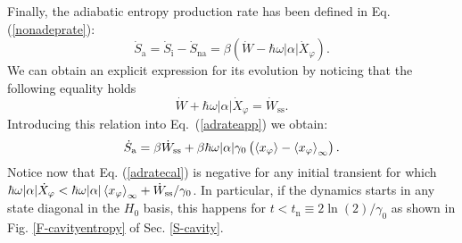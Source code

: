 \documentclass[aps,prx,twocolumn,showpacs,floatfix,superscriptaddress,graphics,longbibliography]{revtex4-1}
\begin{document}
Finally, the adiabatic entropy production rate has been defined in Eq. (\ref{nonadeprate}):
\begin{equation}\label{adrateapp}
\dot{S}_\mathrm{a} = \dot{S}_\mathrm{i} - \dot{S}_\mathrm{na} = \beta(\dot{W} - \hbar \omega |\alpha| \dot{X}_{\varphi}).
\end{equation}
We can obtain an explicit expression for its evolution by noticing that the following equality holds
\begin{equation} 
\dot{W} + \hbar \omega |\alpha| \dot{X}_{\varphi} = \dot{W}_\mathrm{ss}.
\end{equation}
Introducing this relation into Eq.~(\ref{adrateapp}) we obtain:
\begin{equation} \label{adratecal}
 \dot{S}_{\mathrm a} = \beta \dot{W}_{\mathrm{ss}} + \beta \hbar \omega |\alpha| \gamma_0 \left(\langle x_{\varphi} \rangle - \braket{x_{\varphi}}_\infty \right).
\end{equation}
Notice now that Eq. (\ref{adratecal}) is negative for any initial transient for which $\hbar \omega |\alpha| \dot X_{\varphi} < \hbar \omega |\alpha| \braket{x_{\varphi}}_\infty 
+ \dot{W}_{\mathrm{ss}}/\gamma_0$. In particular, if the dynamics starts in any state diagonal in the $H_0$ basis, this happens for $t < t_\mathrm{n} \equiv 2\ln(2)/ \gamma_0$ as shown in  
Fig. \ref{F-cavityentropy} of Sec. \ref{S-cavity}.




%

 
 
\end{document}
